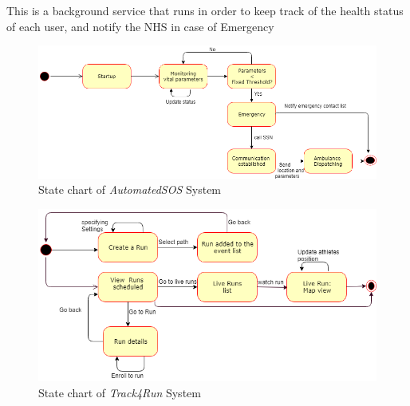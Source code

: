 This is a background service that runs in order to keep track of the health status of each user, and notify the NHS in case of Emergency
\begin{figure}[H]
    \centering
    \includegraphics[scale=0.4]{Pictures/stateChart2.png}
    \caption{State chart of \emph{AutomatedSOS} System}
\end{figure}
\begin{figure}[H]
    \centering
    \includegraphics[scale=0.4]{Pictures/statechart3.png}
    \caption{State chart  of \emph{Track4Run} System}
\end{figure}

